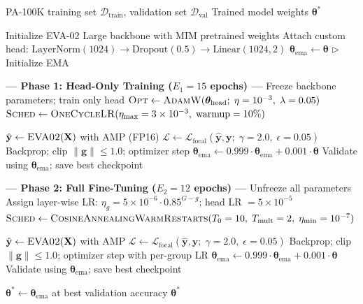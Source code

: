 \documentclass[11pt,a4paper]{article}
\newcommand{\layernorm}{\mathrm{LayerNorm}}
\begin{document}
\begin{algorithm}[H]
\caption{EVA-02 Gender Classifier: Two-Phase Training}\label{alg:gender_train}
\begin{algorithmic}[1]
\Require PA-100K training set $\mathcal{D}_{\text{train}}$, validation set $\mathcal{D}_{\text{val}}$
\Ensure Trained model weights $\boldsymbol{\theta}^*$

\State Initialize EVA-02 Large backbone with MIM pretrained weights
\State Attach custom head: $\layernorm(1024) \to \text{Dropout}(0.5) \to \text{Linear}(1024, 2)$
\State $\boldsymbol{\theta}_{\text{ema}} \gets \boldsymbol{\theta}$ \hfill $\triangleright$ Initialize EMA

\Statex
\Statex \textbf{--- Phase 1: Head-Only Training ($E_1 = 15$ epochs) ---}
\State Freeze backbone parameters; train only head
\State $\textsc{Opt} \gets \textsc{AdamW}(\boldsymbol{\theta}_{\text{head}};\; \eta=10^{-3},\; \lambda=0.05)$
\State $\textsc{Sched} \gets \textsc{OneCycleLR}(\eta_{\max}=3 \times 10^{-3},\; \text{warmup}=10\%)$

        \State $\hat{\mathbf{y}} \gets \textsc{EVA02}(\mathbf{X})$ with AMP (FP16)
        \State $\mathcal{L} \gets \mathcal{L}_{\text{focal}}(\hat{\mathbf{y}}, \mathbf{y};\; \gamma=2.0,\; \epsilon=0.05)$
        \State Backprop; clip $\|\mathbf{g}\| \leq 1.0$; optimizer step
        \State $\boldsymbol{\theta}_{\text{ema}} \gets 0.999 \cdot \boldsymbol{\theta}_{\text{ema}} + 0.001 \cdot \boldsymbol{\theta}$
    \EndFor
    \State Validate using $\boldsymbol{\theta}_{\text{ema}}$; save best checkpoint
\EndFor

\Statex
\Statex \textbf{--- Phase 2: Full Fine-Tuning ($E_2 = 12$ epochs) ---}
\State Unfreeze all parameters
\State Assign layer-wise LR: $\eta_g = 5\!\times\!10^{-6} \cdot 0.85^{G-g}$; head LR $= 5\!\times\!10^{-5}$
\State $\textsc{Sched} \gets \textsc{CosineAnnealingWarmRestarts}(T_0=10,\; T_{\text{mult}}=2,\; \eta_{\min}=10^{-7})$

        \State $\hat{\mathbf{y}} \gets \textsc{EVA02}(\mathbf{X})$ with AMP
        \State $\mathcal{L} \gets \mathcal{L}_{\text{focal}}(\hat{\mathbf{y}}, \mathbf{y};\; \gamma=2.0,\; \epsilon=0.05)$
        \State Backprop; clip $\|\mathbf{g}\| \leq 1.0$; optimizer step with per-group LR
        \State $\boldsymbol{\theta}_{\text{ema}} \gets 0.999 \cdot \boldsymbol{\theta}_{\text{ema}} + 0.001 \cdot \boldsymbol{\theta}$
    \EndFor
    \State Validate using $\boldsymbol{\theta}_{\text{ema}}$; save best checkpoint
\EndFor

\State $\boldsymbol{\theta}^* \gets \boldsymbol{\theta}_{\text{ema}}$ at best validation accuracy
\State \Return $\boldsymbol{\theta}^*$
\end{algorithmic}
\end{algorithm}
\end{document}
